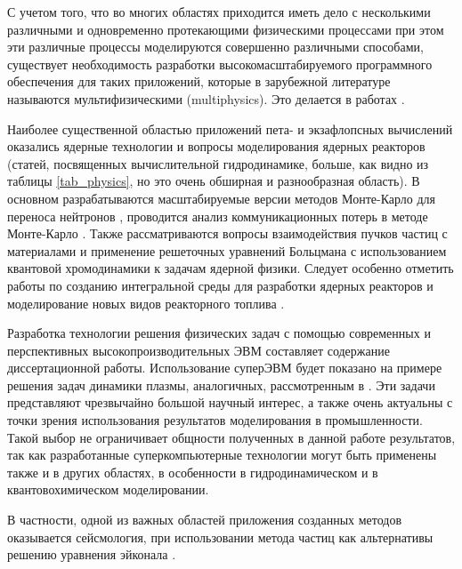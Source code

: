 С учетом того, что во многих областях приходится иметь дело с несколькими различными и одновременно протекающими физическими процессами при этом эти различные процессы моделируются совершенно различными способами, существует необходимость разработки высокомасштабируемого программного обеспечения для таких приложений, которые в зарубежной литературе называются мультифизическими (multiphysics). Это делается в работах \cite{Yamamoto2014576,Agullo201196,Ettrich20151,Vazquez2016,
	Liu2011261,Zheng2015313}.

Наиболее существенной областью приложений пета- и экзафлопсных вычислений оказались ядерные технологии и вопросы моделирования ядерных реакторов (статей, посвященных вычислительной гидродинамике, больше, как видно из таблицы \ref{tab_physics}, но это очень обширная и разнообразная область). В основном разрабатываются масштабируемые версии методов Монте-Карло для переноса нейтронов \cite{Romano2013274,Romano201320,Romano201590,Boyd201443,Gong2012588,Gong20116010,Bergmann2015176,Bauge201432}, проводится анализ коммуникационных потерь в методе Монте-Карло \cite{Siegel20123119,Horelik2014646,Tramm2016}. Также рассматриваются вопросы взаимодействия пучков частиц с материалами \cite{Bandura20103485} и применение решеточных уравнений Больцмана с использованием квантовой хромодинамики к задачам ядерной физики\cite{Beane20111,Savage2012140}.
Следует особенно отметить работы по созданию интегральной среды для разработки ядерных реакторов \cite{Patterson201697} и моделирование новых видов реакторного топлива \cite{Stan200920}.

Разработка технологии решения физических задач с помощью современных и перспективных высокопроизводительных ЭВМ составляет содержание диссертационной работы. Использование суперЭВМ будет показано на примере решения задач динамики плазмы, аналогичных, рассмотренным в \cite{BretPoP2010,BirdsallIEEE,LangdonBirdsall}. Эти задачи представляют чрезвычайно большой научный интерес, а также очень актуальны с точки зрения использования результатов моделирования в промышленности. Такой выбор не ограничивает общности полученных в данной работе результатов, так как разработанные суперкомпьютерные технологии могут быть применены также и в других областях, в особенности в гидродинамическом и в квантовохимическом моделировании.

В частности, одной из важных областей приложения созданных методов оказывается сейсмология, при использовании метода частиц
\cite{hockney,VshivkovPICbook} как альтернативы решению уравнения эйконала \cite{Engquist}.

